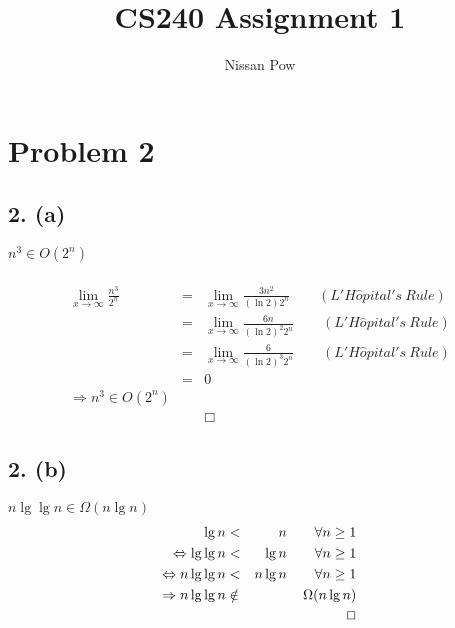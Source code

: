 \documentclass{article}[12pt]
\title{CS240 Assignment 1}
\author{Nissan Pow}
\begin{document}
\maketitle

\section*{Problem 2} 

\subsection*{2. (a)} 
  $n^{3} \in O(2^{n})$ \\ \\
\begin{eqnarray*}
  \lim_{x \to \infty}
    \frac{n^{3}}{2^{n}}
  & = & \lim_{x \to \infty}
    \frac{3n^{2}}{(\ln2)2^{n}} \qquad (L'H\hat{o}pital's\ Rule) \\ 
  & = & \lim_{x \to \infty}
    \frac{6n}{(\ln2)^{2}2^{n}} \qquad (L'H\hat{o}pital's\ Rule) \\ 
  & = & \lim_{x \to \infty}
    \frac{6}{(\ln2)^{3}2^{n}} \qquad (L'H\hat{o}pital's\ Rule) \\ 
  & = & 0 \\
  \Rightarrow n^{3} \in O(2^{n}) \\
  & & \Box
\end{eqnarray*}

\subsection*{2. (b)}
  $n\lg\lg n \in \Omega(n\lg n)$ 
  \begin{eqnarray*}
    \lg n                         & <         & n \qquad \forall n \geq1 \\
    \Leftrightarrow \lg \lg n     & <         & \lg n \qquad \forall n \geq1 \\
    \Leftrightarrow n\lg \lg n    & <         & n\lg n \qquad \forall n \geq1 \\
    \Rightarrow n\lg \lg n        & \notin    & \Omega (n\lg n) \\
    & & \indent \indent \indent \indent \Box \\
  \end{eqnarray*}

\newpage
\end{document}
